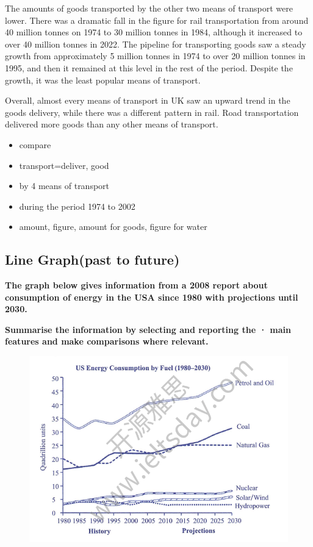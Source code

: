 \documentclass[conference]{IEEEtran}
\begin{document}
The amounts of goods transported by the other two means of transport were lower. 
There was a dramatic fall in the figure for rail transportation from around 40 million tonnes on 1974 to 30 million tonnes in 1984, 
although it increased to over 40 million tonnes in 2022. 
The pipeline for transporting goods saw a steady growth from approximately 5 million tonnes in 1974 to over 20 million tonnes in 1995, 
and then it remained at this level in the rest of the period. Despite the growth, it was the least popular means of transport.

Overall, almost every means of transport in UK saw an upward trend in the goods delivery, 
while there was a different pattern in rail. Road transportation delivered more goods than any other means of transport.

\begin{itemize}
    \item compare
    \item transport=deliver, good
    \item by 4 means of transport
    \item during the period 1974 to 2002
    \item amount, figure, amount for goods, figure for water
\end{itemize}

\subsection{Line Graph(past to future)}

\textbf{The graph below gives information from a 2008 report about consumption of energy in the USA since 1980 with projections until 2030.}

\textbf{Summarise the information by selecting and reporting the · main features and make comparisons where relevant.}

\begin{figure}[htbp]
    \centerline{\includegraphics[width=1.0\columnwidth]{images/Screenshot from 2022-12-04 14-19-49.png}}
\end{figure}
\end{document}
